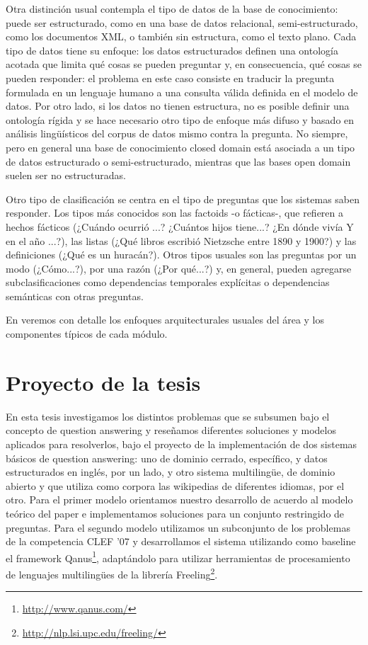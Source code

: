 Otra distinción usual contempla el tipo de datos de la base de conocimiento:  puede ser estructurado, como en una base de datos
relacional, semi-estructurado, como los documentos XML, o también sin estructura, como el texto plano. Cada tipo de datos tiene su enfoque:
los datos estructurados definen una ontología acotada que limita qué cosas se pueden preguntar y, en consecuencia, qué cosas se pueden responder: el problema en este caso consiste en traducir la pregunta formulada en un lenguaje humano a una consulta válida definida en el modelo de datos. Por otro lado, si los datos no tienen estructura, no es posible definir una ontología rígida y se hace necesario otro tipo de enfoque más difuso y basado en análisis lingüísticos del corpus de datos mismo contra la pregunta. No siempre,  pero en general una base de conocimiento closed domain está asociada a un tipo de datos estructurado o semi-estructurado, mientras que las bases open domain suelen ser no estructuradas.

Otro tipo de clasificación se centra en el tipo de preguntas que los sistemas saben responder. Los tipos más conocidos son las factoids -o fácticas-, que refieren a hechos fácticos (¿Cuándo ocurrió ...? ¿Cuántos hijos tiene...? ¿En dónde vivía Y en el año ...?), las listas (¿Qué libros escribió Nietzsche entre 1890 y 1900?) y las definiciones (¿Qué es un huracán?). Otros tipos usuales son las preguntas por un modo (¿Cómo...?), por una razón (¿Por qué...?) y, en general, pueden agregarse subclasificaciones como dependencias temporales explícitas o dependencias semánticas con otras preguntas.

En  veremos con detalle los enfoques arquitecturales usuales del área y los componentes típicos de cada módulo.

\section{Proyecto de la tesis}
\label{sec:proyecto}

En esta tesis investigamos los distintos problemas que se subsumen bajo el concepto de question answering y reseñamos diferentes soluciones y modelos aplicados para resolverlos, bajo el proyecto de la implementación de dos sistemas básicos de question answering: uno de dominio cerrado, específico, y datos estructurados en inglés, por un lado, y otro sistema multilingüe, de dominio abierto y que utiliza como corpora las wikipedias de diferentes idiomas, por el otro. Para el primer modelo orientamos nuestro desarrollo de acuerdo al modelo teórico del paper \cite{QADB1} e implementamos soluciones para un conjunto restringido de preguntas. Para el segundo modelo utilizamos un subconjunto de los problemas de la competencia CLEF '07 y desarrollamos el sistema utilizando como baseline el framework Qanus\footnote{ \url{http://www.qanus.com/}}, adaptándolo para utilizar herramientas de procesamiento de lenguajes multilingües de la librería Freeling\footnote{\url{http://nlp.lsi.upc.edu/freeling/}}.

